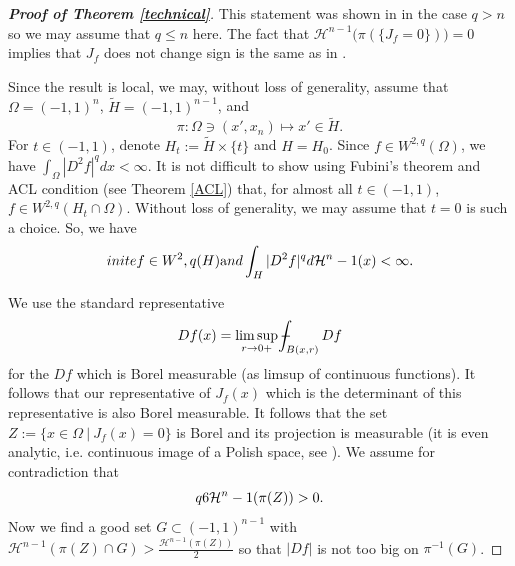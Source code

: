\documentclass[12pt,a4paper]{amsart}
\theoremstyle{plain}
\theoremstyle{definition}
\def\eqn#1$$#2$${\begin{equation}\label#1#2\end{equation}}
\numberwithin{equation}{section}
\def\oint{-\hskip -11pt \int}
\def\haus{\mathcal{H}}
\newcommand{\RR}{\mathbb{R}}
\newcommand{\I}{\int_}
\newcommand{\Om}{\Omega}
\begin{document}
    \begin{proof}[\textbf{Proof of Theorem \ref{technical}}]
		This statement was shown in \cite[Theorem 1.3]{CHMS} in the case $q>n$ so we may assume that $q\leq n$ here. The fact that $\haus^{n-1}\bigl(\pi(\{J_f=0\})\bigr)=0$ implies that $J_f$ does not change sign is the same as in \cite[proof of Corollary 1.4]{CHMS}. 
		
         
        Since the result is local, we may, without loss of generality, assume that $\Om=(-1,1)^n$, $\tilde{H}=(-1,1)^{n-1}$, and 
        $$
        \pi:\Om\ni (x',x_n)\mapsto x'\in\tilde{H}.
        $$ 
				    For $t\in (-1,1)$, denote $H_t:=\tilde{H}\times \{t\}$ and $H=H_0$. Since $f\in W^{2,q}(\Om)$, we have $\I{\Om} |D^2 f|^q dx<\infty$. 
				It is not difficult to show using Fubini's theorem and ACL condition (see Theorem \ref{ACL}) that, for almost all $t\in (-1,1)$, $f\in W^{2,q}(H_t\cap \Om)$. Without loss of generality, we may assume that $t=0$ is such a choice. So, we have
				\eqn{finite}
        $$
    f\in W^{2,q}(H)\text{ and }\I{H}|D^2f|^q d\mathcal{H}^{n-1}(x)<\infty.
        $$
				
				
				We use the standard representative 
				$$
				Df(x)=\limsup_{r\to 0+}\oint_{B(x,r)} Df
				$$
				for the $Df$ which is Borel measurable (as limsup of continuous functions). It follows that our representative of $J_f(x)$ which is the determinant of this representative is also Borel measurable.   
				It follows that the set $Z:= \{x\in \Om\ |\ J_f(x)=0\}$ is Borel and its projection is measurable (it is even analytic, i.e. continuous image of a Polish space, see \cite{Ke}). 
        We assume for contradiction that 
        	\eqn{eq6} 
        	$$
           \haus^{n-1}(\pi(Z))>0.
            $$
						Now we find a good set $G\subset (-1,1)^{n-1}$ with $\haus^{n-1}(\pi(Z)\cap G)>\tfrac{\haus^{n-1}(\pi(Z))}{2}$ so that $|Df|$ is not too big on $\pi^{-1}(G)$. 						
						

\end{proof}
\end{document}
